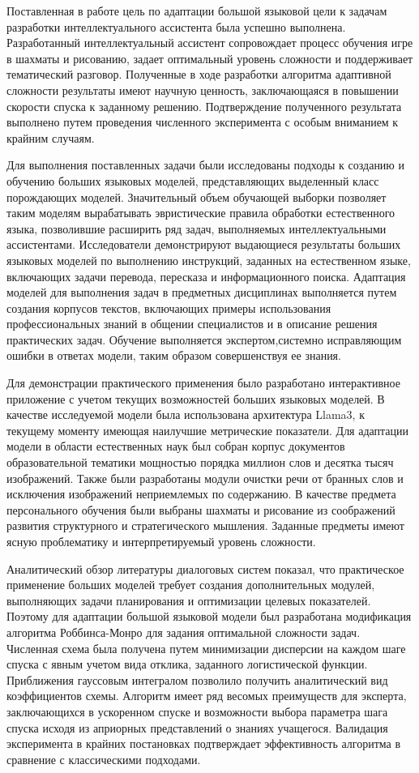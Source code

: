 Поставленная в работе цель по адаптации большой языковой цели к задачам разработки
интеллектуального ассистента была успешно выполнена. Разработанный интеллектуальный ассистент сопровождает процесс обучения 
игре в шахматы и рисованию, задает оптимальный уровень сложности и поддерживает тематический разговор. Полученные в ходе разработки 
алгоритма адаптивной сложности результаты имеют научную ценность, заключающаяся в повышении
скорости спуска к заданному решению. Подтверждение полученного результата выполнено путем проведения численного эксперимента с особым вниманием к крайним случаям.

Для выполнения поставленных задачи были исследованы подходы к созданию и обучению больших языковых моделей, представляющих выделенный класс
порождающих моделей. Значительный объем обучающей выборки позволяет таким моделям вырабатывать эвристические
правила обработки естественного языка, позволившие расширить ряд задач, выполняемых интеллектуальными ассистентами.
Исследователи демонстрируют выдающиеся результаты больших языковых моделей по выполнению инструкций, 
заданных на естественном языке, 
включающих задачи перевода, пересказа и информационного поиска. Адаптация моделей для выполнения задач в предметных дисциплинах
выполняется путем создания корпусов текстов, включающих примеры использования профессиональных знаний в общении специалистов и в описание
решения практических задач. Обучение выполняется экспертом,системно исправляющим ошибки в ответах модели, таким образом совершенствуя 
ее знания.  

Для демонстрации практического применения было разработано интерактивное приложение с 
учетом текущих возможностей больших языковых моделей. В качестве исследуемой модели была использована архитектура Llama3,
к текущему моменту имеющая наилучшие метрические показатели. Для адаптации модели в области естественных наук был собран корпус
документов образовательной тематики мощностью порядка миллион слов и десятка тысяч изображений. Также были разработаны 
модули очистки речи от бранных слов и исключения изображений неприемлемых по содержанию. В качестве предмета персонального обучения были 
выбраны шахматы и рисование из соображений развития структурного и стратегического мышления. Заданные предметы имеют ясную проблематику и 
интерпретируемый уровень сложности.

Аналитический обзор литературы диалоговых систем показал, что практическое применение больших моделей 
требует создания дополнительных модулей, выполняющих задачи планирования и оптимизации целевых показателей. Поэтому для адаптации
большой языковой модели был разработана модификация алгоритма Роббинса-Монро для задания оптимальной сложности задач. Численная
схема была получена путем минимизации дисперсии на каждом шаге спуска с явным учетом вида отклика, заданного логистической функции.
Приближения гауссовым интегралом позволило получить аналитический вид коэффициентов схемы. Алгоритм имеет ряд весомых преимуществ для эксперта,
заключающихся в ускоренном спуске и возможности выбора параметра шага спуска исходя из априорных представлений 
о знаниях учащегося. Валидация эксперимента в крайних постановках подтверждает эффективность алгоритма в сравнение с классическими подходами.

